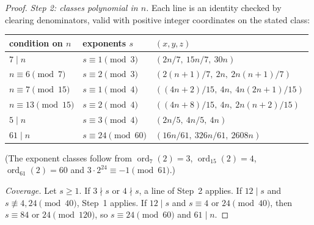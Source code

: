 \documentclass[11pt,reqno]{amsart}
\theoremstyle{definition}
\newcommand{\ord}{\operatorname{ord}}
\begin{document}
\begin{proof}
\emph{Step 2: classes polynomial in $n$.}  Each line is an identity checked by
clearing denominators, valid with positive integer coordinates on the
stated class:
\begin{center}\small
\begin{tabular}{lll}
\toprule
condition on $n$ & exponents $s$ & $(x,y,z)$\\
\midrule
$7\mid n$ & $s\equiv1\pmod3$ & $(2n/7,\ 15n/7,\ 30n)$\\
$n\equiv6\pmod7$ & $s\equiv2\pmod3$ & $(2(n+1)/7,\ 2n,\ 2n(n+1)/7)$\\
$n\equiv7\pmod{15}$ & $s\equiv1\pmod4$ & $((4n+2)/15,\ 4n,\ 4n(2n+1)/15)$\\
$n\equiv13\pmod{15}$ & $s\equiv2\pmod4$ & $((4n+8)/15,\ 4n,\ 2n(n+2)/15)$\\
$5\mid n$ & $s\equiv3\pmod4$ & $(2n/5,\ 4n/5,\ 4n)$\\
$61\mid n$ & $s\equiv24\pmod{60}$ & $(16n/61,\ 326n/61,\ 2608n)$\\
\bottomrule
\end{tabular}
\end{center}
(The exponent classes follow from $\ord_7(2)=3$, $\ord_{15}(2)=4$,
$\ord_{61}(2)=60$ and $3\cdot2^{24}\equiv-1\pmod{61}$.)

\emph{Coverage.}  Let $s\ge1$.  If $3\nmid s$ or $4\nmid s$, a line of
Step~2 applies.  If $12\mid s$ and $s\not\equiv4,24\pmod{40}$, Step~1
applies.  If $12\mid s$ and $s\equiv4$ or $24\pmod{40}$, then
$s\equiv84$ or $24\pmod{120}$, so $s\equiv24\pmod{60}$ and $61\mid n$.
\end{proof}
\end{document}
